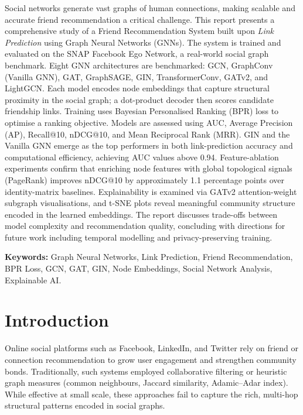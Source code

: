 \documentclass[12pt,a4paper]{article}
\begin{document}
\noindent
Social networks generate vast graphs of human connections, making scalable and accurate friend recommendation a critical challenge. This report presents a comprehensive study of a Friend Recommendation System built upon \textit{Link Prediction} using Graph Neural Networks (GNNs). The system is trained and evaluated on the SNAP Facebook Ego Network, a real-world social graph benchmark. Eight GNN architectures are benchmarked: GCN, GraphConv (Vanilla GNN), GAT, GraphSAGE, GIN, TransformerConv, GATv2, and LightGCN. Each model encodes node embeddings that capture structural proximity in the social graph; a dot-product decoder then scores candidate friendship links. Training uses Bayesian Personalised Ranking (BPR) loss to optimise a ranking objective. Models are assessed using AUC, Average Precision (AP), Recall@10, nDCG@10, and Mean Reciprocal Rank (MRR). GIN and the Vanilla GNN emerge as the top performers in both link-prediction accuracy and computational efficiency, achieving AUC values above 0.94. Feature-ablation experiments confirm that enriching node features with global topological signals (PageRank) improves nDCG@10 by approximately 1.1 percentage points over identity-matrix baselines. Explainability is examined via GATv2 attention-weight subgraph visualisations, and t-SNE plots reveal meaningful community structure encoded in the learned embeddings. The report discusses trade-offs between model complexity and recommendation quality, concluding with directions for future work including temporal modelling and privacy-preserving training.

\vspace{0.4cm}
\noindent\textbf{Keywords:} Graph Neural Networks, Link Prediction, Friend Recommendation, BPR Loss, GCN, GAT, GIN, Node Embeddings, Social Network Analysis, Explainable AI.

\newpage
\tableofcontents
\listoffigures
\listoftables

\newpage
\section{Introduction}

Online social platforms such as Facebook, LinkedIn, and Twitter rely on friend or connection recommendation to grow user engagement and strengthen community bonds. Traditionally, such systems employed collaborative filtering or heuristic graph measures (common neighbours, Jaccard similarity, Adamic--Adar index). While effective at small scale, these approaches fail to capture the rich, multi-hop structural patterns encoded in social graphs.
\end{document}
